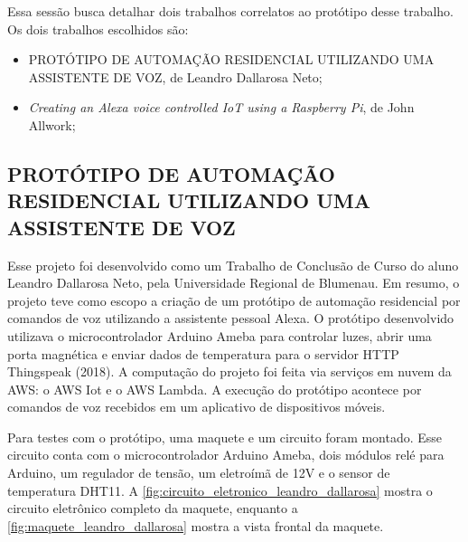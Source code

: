 Essa sessão busca detalhar dois trabalhos correlatos ao protótipo desse trabalho. Os dois trabalhos escolhidos são:

\begin{itemize}
	\item PROTÓTIPO DE AUTOMAÇÃO RESIDENCIAL UTILIZANDO UMA ASSISTENTE DE VOZ, de Leandro Dallarosa Neto;
	\item \textit{Creating an Alexa voice controlled IoT using a Raspberry Pi}, de John Allwork;
\end{itemize}

\subsection{PROTÓTIPO DE AUTOMAÇÃO RESIDENCIAL UTILIZANDO UMA ASSISTENTE DE VOZ}\label{subsection:prototipo_de_automacao_residencial_utilizando_uma_assistente_de_voz}

Esse projeto foi desenvolvido como um Trabalho de Conclusão de Curso do aluno Leandro Dallarosa Neto, pela Universidade Regional de Blumenau. Em resumo, o projeto teve como escopo a criação de um protótipo de automação residencial por comandos de voz utilizando a assistente pessoal Alexa. O protótipo desenvolvido utilizava o microcontrolador Arduino Ameba para controlar luzes, abrir uma porta magnética e enviar dados de temperatura para o servidor HTTP Thingspeak (2018). A computação do projeto foi feita via serviços em nuvem da AWS: o AWS Iot e o AWS Lambda. A execução do protótipo acontece por comandos de voz recebidos em um aplicativo de dispositivos móveis.

Para testes com o protótipo, uma maquete e um circuito foram montado. Esse circuito conta com o microcontrolador Arduino Ameba, dois módulos relé para Arduino, um regulador de tensão, um eletroímã de 12V e o sensor de temperatura DHT11. A \autoref{fig:circuito_eletronico_leandro_dallarosa} mostra o circuito eletrônico completo da maquete, enquanto a \autoref{fig:maquete_leandro_dallarosa} mostra a vista frontal da maquete.

